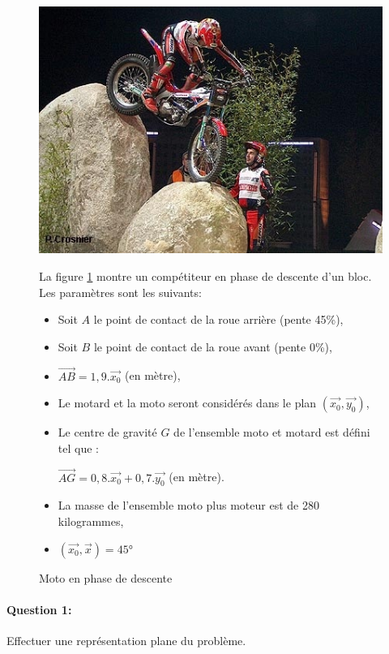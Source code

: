 \begin{figure}[!h]
\begin{minipage}{0.48\linewidth}
 \centering\includegraphics[width=0.7\linewidth]{img/Trial_des.jpg}
 \caption{Moto en phase de descente}
  \label{img2}
\end{minipage}
\hfill
\begin{minipage}{0.48\linewidth}
 La figure \ref{img2} montre un compétiteur en phase de descente d'un bloc. Les paramètres sont les suivants:
 \begin{itemize}
  \item Soit $A$ le point de contact de la roue arrière (pente 45\%),
  \item Soit $B$ le point de contact de la roue avant (pente 0\%),
  \item $\overrightarrow{AB}=1,9.\overrightarrow{x_0}$ (en mètre),
  \item Le motard et la moto seront considérés dans le plan $(\overrightarrow{x_0},\overrightarrow{y_0})$,
  \item Le centre de gravité $G$ de l'ensemble moto et motard est défini tel que :
  
  $\overrightarrow{AG}=0,8.\overrightarrow{x_0}+0,7.\overrightarrow{y_0}$ (en mètre).
  \item La masse de l'ensemble moto plus moteur est de 280 kilogrammes,
  \item $(\overrightarrow{x_0},\overrightarrow{x})=45°$
 \end{itemize}
\end{minipage}
\end{figure}

\paragraph{Question 1:} Effectuer une représentation plane du problème.

